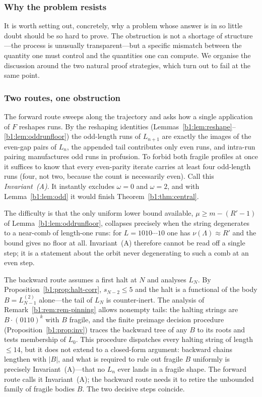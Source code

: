 \documentclass[a4paper]{article}
\theoremstyle{plain}
\theoremstyle{definition}
\theoremstyle{remark}
\begin{document}
\subsubsection{Why the problem resists}\label{b1:sec:resist}
It is worth setting out, concretely, why a problem whose answer is in so little doubt should be so hard to prove. The obstruction is not a shortage of structure---the process is unusually transparent---but a specific mismatch between the quantity one must control and the quantities one can compute. We organise the discussion around the two natural proof strategies, which turn out to fail at the same point.

\subsubsection{Two routes, one obstruction}\label{b1:sec:13.1}
The forward route sweeps along the trajectory and asks how a single application of $F$ reshapes runs. By the reshaping identities (Lemmas~\ref{b1:lem:reshape}--\ref{b1:lem:oddrunfloor}) the odd-length runs of $L_{n+1}$ are exactly the images of the even-gap pairs of $L_n$, the appended tail contributes only even runs, and intra-run pairing manufactures odd runs in profusion. To forbid both fragile profiles at once it suffices to know that every even-parity iterate carries at least four odd-length runs (four, not two, because the count is necessarily even). Call this \emph{Invariant~(A)}. It instantly excludes $\omega=0$ and $\omega=2$, and with Lemma~\ref{b1:lem:odd} it would finish Theorem~\ref{b1:thm:central}.

The difficulty is that the only uniform lower bound available, $\mu\ge m-(R'-1)$ of Lemma~\ref{b1:lem:oddrunfloor}, collapses precisely when the string degenerates to a near-comb of length-one runs: for $L=1010\cdots 10$ one has $\nu(\Lambda)\approx R'$ and the bound gives no floor at all. Invariant~(A) therefore cannot be read off a single step; it is a statement about the orbit never degenerating to such a comb at an even step.

The backward route assumes a first halt at $N$ and analyses $L_N$. By Proposition~\ref{b1:prop:halt-corr}, $s_{N-2}\le 5$ and the halt is a functional of the body $B=L^{(2)}_{N-1}$ alone---the tail of $L_N$ is counter-inert. The analysis of Remark~\ref{b1:rem:rem-pinning} allows nonempty tails: the halting strings are $B\cdot(0110)^k$ with $B$ fragile, and the finite preimage decision procedure (Proposition~\ref{b1:prop:inv}) traces the backward tree of any $B$ to its roots and tests membership of $L_0$. This procedure dispatches every halting string of length $\le 14$, but it does not extend to a closed-form argument: backward chains lengthen with $|B|$, and what is required to rule out fragile $B$ uniformly is precisely Invariant~(A)---that no $L_n$ ever lands in a fragile shape. The forward route calls it Invariant~(A); the backward route needs it to retire the unbounded family of fragile bodies $B$. The two decisive steps coincide.
\end{document}
